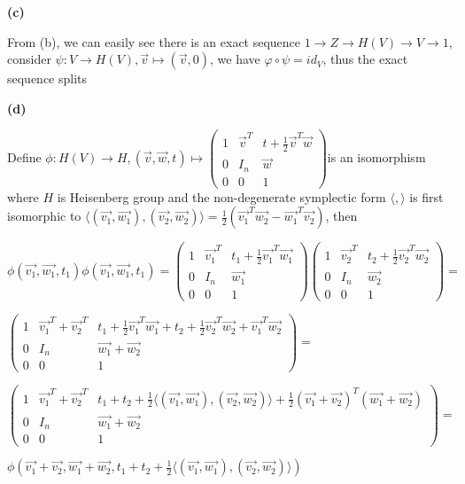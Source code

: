 \documentclass[10pt]{article}
\newcommand{\<}[1]{\langle #1 \rangle}
\begin{document}
\textbf{(c)} \par
From (b), we can easily see there is an exact sequence $1\rightarrow Z\rightarrow H(V)\rightarrow V\rightarrow 1$, consider $\psi:V\rightarrow H(V), \vec{v}\mapsto(\vec{v},0)$, we have $\varphi\circ\psi=id_V$, thus the exact sequence splits \par
\textbf{(d)} \par
Define $\phi:H(V)\rightarrow H, (\vec{v},\vec{w},t)\mapsto\left( {\begin{array}{ccc}
1 & \vec{v}^T & t+\frac{1}{2}\vec{v}^T\vec{w} \\
0 & I_{n}& \vec{w} \\
0 & 0 & 1
\end{array} } \right)$is an isomorphism where $H$ is Heisenberg group and the non-degenerate symplectic form $\<{,}$ is first isomorphic to $\<{(\vec{v_1},\vec{w_1}),(\vec{v_2},\vec{w_2})}=\frac{1}{2}(\vec{v_1}^T\vec{w_2}-\vec{w_1}^T\vec{v_2})$, then \par
$\phi(\vec{v_1},\vec{w_1},t_1)\phi(\vec{v_1},\vec{w_1},t_1)=\left( {\begin{array}{ccc}
1 & \vec{v_1}^T & t_1+\frac{1}{2}\vec{v_1}^T\vec{w_1} \\
0 & I_{n}& \vec{w_1} \\
0 & 0 & 1
\end{array} } \right)\left( {\begin{array}{ccc}
1 & \vec{v_2}^T & t_2+\frac{1}{2}\vec{v_2}^T\vec{w_2} \\
0 & I_{n}& \vec{w_2} \\
0 & 0 & 1
\end{array} } \right)=$\par
$\left( {\begin{array}{ccc}
1 & \vec{v_1}^T+\vec{v_2}^T & t_1+\frac{1}{2}\vec{v_1}^T\vec{w_1}+ t_2+\frac{1}{2}\vec{v_2}^T\vec{w_2}+\vec{v_1}^T\vec{w_2} \\
0 & I_{n}& \vec{w_1}+\vec{w_2} \\
0 & 0 & 1
\end{array} } \right)=$\par
$\left( {\begin{array}{ccc}
1 & \vec{v_1}^T+\vec{v_2}^T & t_1+t_2+\frac{1}{2}\<{(\vec{v_1},\vec{w_1}),(\vec{v_2},\vec{w_2})}+\frac{1}{2}(\vec{v_1}+\vec{v_2})^T(\vec{w_1}+\vec{w_2}) \\
0 & I_{n}& \vec{w_1}+\vec{w_2} \\
0 & 0 & 1
\end{array} } \right)=$\par
$\phi(\vec{v_1}+\vec{v_2},\vec{w_1}+\vec{w_2},t_1+t_2+\frac{1}{2}\<{(\vec{v_1},\vec{w_1}),(\vec{v_2},\vec{w_2})})$ \par
\end{document}
